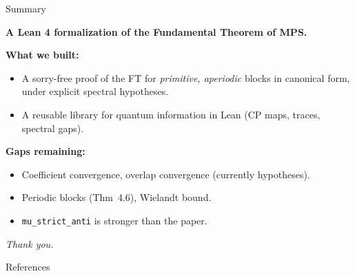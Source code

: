 \documentclass[aspectratio=169,10pt]{beamer}
\begin{document}
\begin{frame}{Summary}
    \begin{center}
        \Large \textbf{A Lean 4 formalization of the Fundamental Theorem of MPS.}
    \end{center}
    
    \vspace{0.5em}
    \textbf{What we built:}
    \begin{itemize}
        \item A sorry-free proof of the FT for \emph{primitive, aperiodic} blocks in canonical form, under explicit spectral hypotheses.
        \item A reusable library for quantum information in Lean (CP maps, traces, spectral gaps).
    \end{itemize}

    \vspace{0.5em}
    \textbf{Gaps remaining:}
    \begin{itemize}
        \item Coefficient convergence, overlap convergence (currently hypotheses).
        \item Periodic blocks (Thm~4.6), Wielandt bound.
        \item \texttt{mu\_strict\_anti} is stronger than the paper.
    \end{itemize}

    \vspace{0.5em}
    \hfill \textit{Thank you.}
\end{frame}

\begin{frame}[allowframebreaks]{References}
    
\end{frame}
\end{document}
